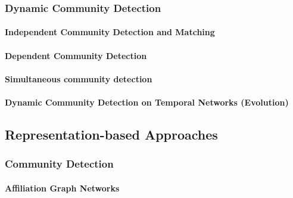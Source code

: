 \documentclass[
acmsmall,
nonacm,
screen,
acmthm]{../../scripts/pandoc/templates/acmart}
\begin{document}
\hypertarget{dynamic-community-detection}{%
\subsubsection{Dynamic Community
Detection}\label{dynamic-community-detection}}

\hypertarget{independent-community-detection-and-matching}{%
\paragraph{Independent Community Detection and
Matching}\label{independent-community-detection-and-matching}}

\hypertarget{dependent-community-detection}{%
\paragraph{Dependent Community
Detection}\label{dependent-community-detection}}

\hypertarget{simultaneous-community-detection}{%
\paragraph{Simultaneous community
detection}\label{simultaneous-community-detection}}

\hypertarget{dynamic-community-detection-on-temporal-networks-evolution}{%
\paragraph{Dynamic Community Detection on Temporal Networks
(Evolution)}\label{dynamic-community-detection-on-temporal-networks-evolution}}

\hypertarget{representation-based-approaches}{%
\subsection{Representation-based
Approaches}\label{representation-based-approaches}}

\hypertarget{community-detection-2}{%
\subsubsection{Community Detection}\label{community-detection-2}}

\hypertarget{affiliation-graph-networks}{%
\paragraph{Affiliation Graph
Networks}\label{affiliation-graph-networks}}
\end{document}
